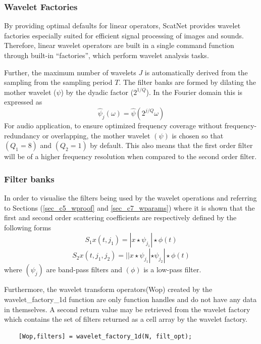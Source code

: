 \subsubsection{Wavelet Factories}\label{sec_c3_scat00} 
By providing optimal defaults for linear operators, ScatNet provides wavelet factories especially suited for efficient signal processing of images and sounds.  Therefore, linear wavelet operators are built in a single command function through built-in “factories”, which perform wavelet analysis tasks.

Further, the maximum number of wavelets $J$ is automatically derived from the sampling from the sampling period $T$.  The filter banks are formed by dilating the mother wavelet ($\psi$) by the dyadic factor ($2^{1/Q}$).  In the Fourier domain this is expressed as
\begin{equation}
     \hat\psi_j(\omega) = \hat\psi(2^{j/Q}\omega)
     \label{eqn_c3_scat01}
\end{equation}
For audio application, to ensure optimized frequency coverage without frequency-redundancy or overlapping, the mother wavelet $(\psi)$ is chosen so that  $(Q_1 = 8)$ and $(Q_2 = 1)$ by default. This also means that the first order filter will be of a higher frequency resolution when compared to the second order filter. 
\subsubsection{Filter banks}\label{sec_c3_scat01}
In order to visualise the filters being used by the wavelet operations and referring to Sections (\ref{sec_c5_wproof} and \ref{sec_c7_wparams}) where it is shown that the first and second order scattering coefficients are respectively defined by the following forms
\begin{equation}
    S_1x(t,j_1) = |x\star\psi_{j_1}|\star\phi(t)
    \label{eqn_c3_scat02}
\end{equation}
\begin{equation}
    S_2x(t,j_1,j_2) = ||x\star\psi_{j_1}|\star\psi_{j_2}|\star\phi(t) \label{eqn_c3_scat03}
\end{equation}
where $(\psi_{j})$ are band-pass filters and $(\phi)$ is  a low-pass filter.

Furthermore, the wavelet transform operators(Wop) created by the wavelet\_factory\_1d function are only function handles and do not have any data in themselves. A second return value may be retrieved from the wavelet factory which contains the set of filters returned as a cell array by the wavelet factory.
\begin{verbatim}
    [Wop,filters] = wavelet_factory_1d(N, filt_opt);
\end{verbatim}

